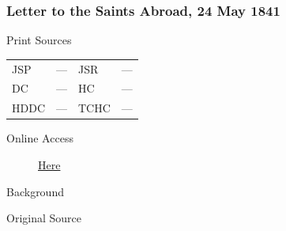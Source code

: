 		\subsubsection{Letter to the Saints Abroad, 24 May 1841}
			\label{EMS-1841-JS-24-MAY-1841}
			
			\begin{description}
				\item[Print Sources]
			\end{description}

			\begin{tabular}{p{0.5in}p{1in}p{0.5in}p{1in}}
				JSP	 	& ---		& JSR 		& --- \\
				DC	 	& ---		& HC 		& --- \\
				HDDC 	& ---		& TCHC 		& --- \\
			\end{tabular}
			
			\begin{description}
				\item[Online Access] \href{https://www.josephsmithpapers.org/paper-summary/letter-to-the-saints-abroad-24may-1841/1}{Here}
			\end{description}
			
			\begin{description}
				\item[Background]
			\end{description}
			
			
			\begin{description}
				\item[Original Source]
			\end{description}
			
			
